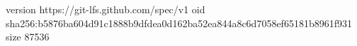 version https://git-lfs.github.com/spec/v1
oid sha256:b5876ba604d91c1888b9dfdea0d162ba52ea844a8c6d7058ef65181b8961f931
size 87536
